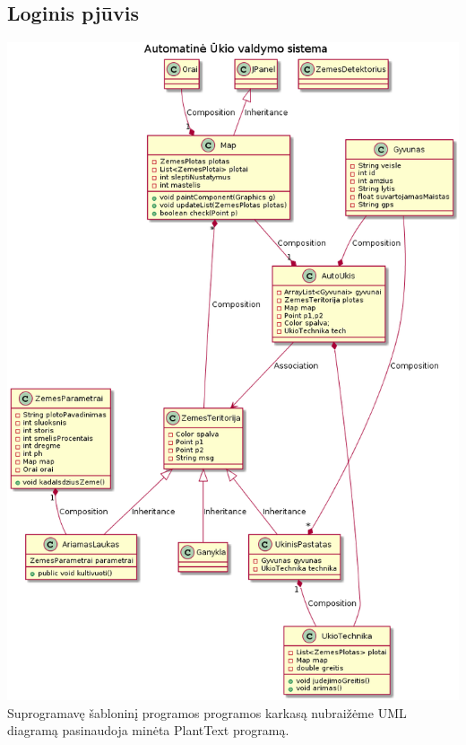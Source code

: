 \documentclass[oneside]{VUMIFPSkursinis}
\begin{document}
\subsection{Loginis pjūvis}
	\includegraphics[width=\textwidth,height=\textheight,keepaspectratio]{uml.png}	
	Suprogramavę šabloninį programos programos karkasą nubraižėme UML diagramą pasinaudoja minėta PlantText programą. 
\end{document}
